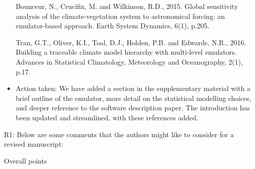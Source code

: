 \documentclass[esd, manuscript]{copernicus}
\begin{document}
\begin{itemize}
{Bounceur, N., Crucifix, M. and Wilkinson, R.D., 2015. Global sensitivity analysis of the climate-vegetation system to astronomical forcing: an emulator-based approach. Earth System Dynamics, 6(1), p.205.

Tran, G.T., Oliver, K.I., Toal, D.J., Holden, P.B. and Edwards, N.R., 2016. Building a traceable climate model hierarchy with multi-level emulators. Advances in Statistical Climatology, Meteorology and Oceanography, 2(1), p.17.}

\item{Action taken: We have added a section in the supplementary material with a brief outline of the emulator, more detail on the statistical modelling choices, and deeper reference to the software description paper. The introduction has been updated and streamlined, with these references added.}
\end{itemize}

R1: Below are some comments that the authors might like to consider for a revised manuscript:

Overall points
\end{document}
